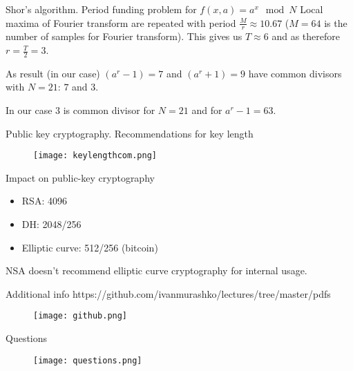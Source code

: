 \documentclass[10pt,pdf,hyperref={unicode}]{beamer}
\begin{document}
\begin{frame}{Shor's algorithm. Period funding problem for
  $f\left(x, a\right) = a^x \mod{N}$}
  Local maxima of Fourier transform are repeated with period
  $\frac{M}{r} \approx 10.67$ ($M = 64$ is the number of samples for
  Fourier transform). This gives us $T\approx 6$ and as therefore
  $r=\frac{T}{2}=3$.

  As result (in our case)
  $(a^r-1) = 7$ and $(a^r + 1) = 9$ have common divisors with
  $N=21$: $7$ and $3$.

  In our case $3$ is common divisor for $N=21$ and for $a^r-1 = 63$.
\end{frame}


\begin{frame}{Public key cryptography. Recommendations for key length}
 \begin{figure} 
   \texttt{[image: keylengthcom.png]}
  \end{figure}
\end{frame}

\begin{frame}{Impact on public-key cryptography}
\begin{itemize}
\item RSA: 4096
\item DH: 2048/256
\item Elliptic curve: 512/256 (bitcoin) 
\end{itemize}

NSA doesn't recommend elliptic curve cryptography for internal usage.
\end{frame}


\begin{frame}{Additional info}
https://github.com/ivanmurashko/lectures/tree/master/pdfs
 \begin{figure} 
   \texttt{[image: github.png]}
  \end{figure}
\end{frame}

\begin{frame}{Questions}
 \begin{figure} 
   \texttt{[image: questions.png]}
  \end{figure}
\end{frame}
\end{document}
